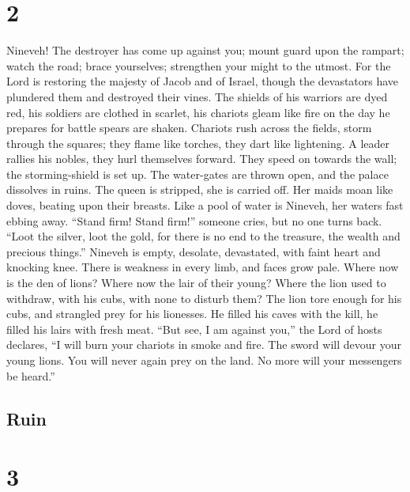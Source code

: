 \hypertarget{section-1}{%
\section{2}\label{section-1}}

 Nineveh! The destroyer has come up against you; mount guard
upon the rampart; watch the road; brace yourselves; strengthen your
might to the utmost.  For the Lord is restoring the majesty
of Jacob and of Israel, though the devastators have plundered them and
destroyed their vines.  The shields of his warriors are dyed
red, his soldiers are clothed in scarlet, his chariots gleam like fire
on the day he prepares for battle spears are shaken. 
Chariots rush across the fields, storm through the squares; they flame
like torches, they dart like lightening.  A leader rallies
his nobles, they hurl themselves forward. They speed on towards the
wall; the storming-shield is set up.  The water-gates are
thrown open, and the palace dissolves in ruins.  The queen
is stripped, she is carried off. Her maids moan like doves, beating upon
their breasts.  Like a pool of water is Nineveh, her waters
fast ebbing away. ``Stand firm! Stand firm!'' someone cries, but no one
turns back.  ``Loot the silver, loot the gold, for there is
no end to the treasure, the wealth and precious things.'' 
Nineveh is empty, desolate, devastated, with faint heart and knocking
knee. There is weakness in every limb, and faces grow pale.
 Where now is the den of lions? Where now the lair of their
young? Where the lion used to withdraw, with his cubs, with none to
disturb them?  The lion tore enough for his cubs, and
strangled prey for his lionesses. He filled his caves with the kill, he
filled his lairs with fresh meat.  ``But see, I am against
you,'' the Lord of hosts declares, ``I will burn your chariots in smoke
and fire. The sword will devour your young lions. You will never again
prey on the land. No more will your messengers be heard.''

\hypertarget{ruin}{%
\subsection{Ruin}\label{ruin}}

\hypertarget{section-2}{%
\section{3}\label{section-2}}

